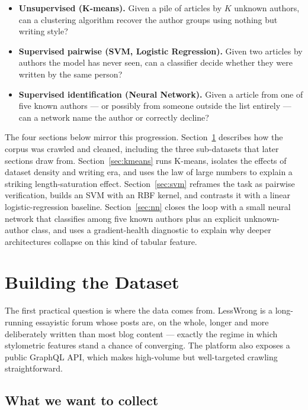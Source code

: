 \documentclass[11pt]{article}
\begin{document}
\begin{itemize}\setlength\itemsep{2pt}
  \item \textbf{Unsupervised (K-means).} Given a pile of articles by $K$
        unknown authors, can a clustering algorithm recover the author groups
        using nothing but writing style?
  \item \textbf{Supervised pairwise (SVM, Logistic Regression).} Given two
        articles by authors the model has never seen, can a classifier decide
        whether they were written by the same person?
  \item \textbf{Supervised identification (Neural Network).} Given a article
        from one of five known authors --- or possibly from someone outside the
        list entirely --- can a network name the author or correctly decline?
\end{itemize}

The four sections below mirror this progression. Section~\ref{sec:data} describes
how the corpus was crawled and cleaned, including the three sub-datasets that
later sections draw from. Section~\ref{sec:kmeans} runs K-means, isolates the
effects of dataset density and writing era, and uses the law of large numbers to
explain a striking length-saturation effect. Section~\ref{sec:svm} reframes the
task as pairwise verification, builds an SVM with an RBF kernel, and contrasts
it with a linear logistic-regression baseline. Section~\ref{sec:nn} closes the
loop with a small neural network that classifies among five known authors plus
an explicit unknown-author class, and uses a gradient-health diagnostic to
explain why deeper architectures collapse on this kind of tabular feature.

\section{Building the Dataset}
\label{sec:data}

The first practical question is where the data comes from. LessWrong is a
long-running essayistic forum whose posts are, on the whole, longer and more
deliberately written than most blog content --- exactly the regime in which
stylometric features stand a chance of converging. The platform also exposes a
public GraphQL API, which makes high-volume but well-targeted crawling
straightforward.

\subsection{What we want to collect}
\end{document}
